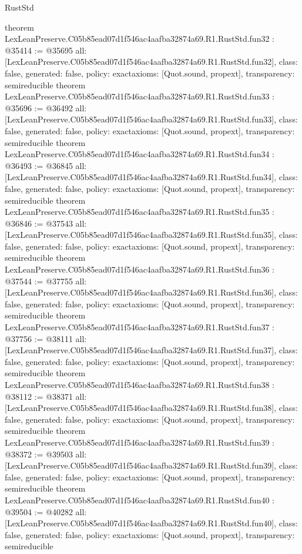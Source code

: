 \begin{lexlean}{RustStd}
\begin{coremodule}
{}
theorem LexLeanPreserve.C05b85ead07d1f546ac4aafba32874a69.R1.RustStd.fun32 : @35414 := @35695 {
  all: [LexLeanPreserve.C05b85ead07d1f546ac4aafba32874a69.R1.RustStd.fun32],
  class: false,
  generated: false,
  policy: exact{axioms: [Quot.sound, propext]},
  transparency: semireducible
}
theorem LexLeanPreserve.C05b85ead07d1f546ac4aafba32874a69.R1.RustStd.fun33 : @35696 := @36492 {
  all: [LexLeanPreserve.C05b85ead07d1f546ac4aafba32874a69.R1.RustStd.fun33],
  class: false,
  generated: false,
  policy: exact{axioms: [Quot.sound, propext]},
  transparency: semireducible
}
theorem LexLeanPreserve.C05b85ead07d1f546ac4aafba32874a69.R1.RustStd.fun34 : @36493 := @36845 {
  all: [LexLeanPreserve.C05b85ead07d1f546ac4aafba32874a69.R1.RustStd.fun34],
  class: false,
  generated: false,
  policy: exact{axioms: [Quot.sound, propext]},
  transparency: semireducible
}
theorem LexLeanPreserve.C05b85ead07d1f546ac4aafba32874a69.R1.RustStd.fun35 : @36846 := @37543 {
  all: [LexLeanPreserve.C05b85ead07d1f546ac4aafba32874a69.R1.RustStd.fun35],
  class: false,
  generated: false,
  policy: exact{axioms: [Quot.sound, propext]},
  transparency: semireducible
}
theorem LexLeanPreserve.C05b85ead07d1f546ac4aafba32874a69.R1.RustStd.fun36 : @37544 := @37755 {
  all: [LexLeanPreserve.C05b85ead07d1f546ac4aafba32874a69.R1.RustStd.fun36],
  class: false,
  generated: false,
  policy: exact{axioms: [Quot.sound, propext]},
  transparency: semireducible
}
theorem LexLeanPreserve.C05b85ead07d1f546ac4aafba32874a69.R1.RustStd.fun37 : @37756 := @38111 {
  all: [LexLeanPreserve.C05b85ead07d1f546ac4aafba32874a69.R1.RustStd.fun37],
  class: false,
  generated: false,
  policy: exact{axioms: [Quot.sound, propext]},
  transparency: semireducible
}
theorem LexLeanPreserve.C05b85ead07d1f546ac4aafba32874a69.R1.RustStd.fun38 : @38112 := @38371 {
  all: [LexLeanPreserve.C05b85ead07d1f546ac4aafba32874a69.R1.RustStd.fun38],
  class: false,
  generated: false,
  policy: exact{axioms: [Quot.sound, propext]},
  transparency: semireducible
}
theorem LexLeanPreserve.C05b85ead07d1f546ac4aafba32874a69.R1.RustStd.fun39 : @38372 := @39503 {
  all: [LexLeanPreserve.C05b85ead07d1f546ac4aafba32874a69.R1.RustStd.fun39],
  class: false,
  generated: false,
  policy: exact{axioms: [Quot.sound, propext]},
  transparency: semireducible
}
theorem LexLeanPreserve.C05b85ead07d1f546ac4aafba32874a69.R1.RustStd.fun40 : @39504 := @40282 {
  all: [LexLeanPreserve.C05b85ead07d1f546ac4aafba32874a69.R1.RustStd.fun40],
  class: false,
  generated: false,
  policy: exact{axioms: [Quot.sound, propext]},
  transparency: semireducible
}
\end{coremodule}
\end{lexlean}
